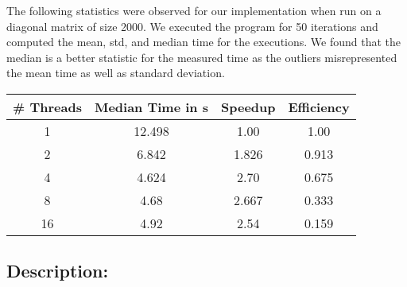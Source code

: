 \documentclass[12pt]{article}
\begin{document}
  The following statistics were observed for our implementation when run on a diagonal matrix of size 2000. We executed the program for 50 iterations and computed the mean, std, and median time for the executions. We found that the median is a
  better statistic for the measured time as the outliers misrepresented the mean time as well as standard deviation.
  \begin{table}[h!]
    \begin{center}
      \begin{tabular}{|c|c|c|c|} %
      \hline
      \textbf{\# Threads} & \textbf{Median Time in s} & \textbf{Speedup} &\textbf{Efficiency}\\
        \hline  
        1 & 12.498& 1.00& 1.00\\
        2 & 6.842& 1.826& 0.913\\
        4 & 4.624 & 2.70 & 0.675\\
        8 & 4.68 & 2.667 & 0.333\\
        16 & 4.92 & 2.54 & 0.159\\
        \hline
      \end{tabular}
    \end{center}
  \end{table}

\subsection*{Description:}
\end{document}
